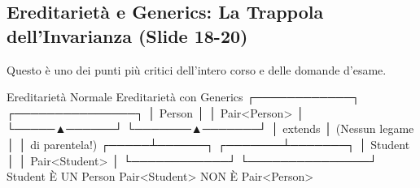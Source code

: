 \documentclass[11pt,a4paper,oneside]{report}
\begin{document}
\subsection{Ereditarietà e Generics: La Trappola dell'Invarianza (Slide
18-20)}\label{chap14_ereditarietuxe0-e-generics-la-trappola-dellinvarianza-slide-18-20}

Questo è uno dei punti più critici dell'intero corso e delle domande
d'esame.

\needspace{7cm}
\begin{asciibox}
   Ereditarietà Normale             Ereditarietà con Generics
      ┌────────────┐                     ┌───────────────┐
      │   Person   │                     │ Pair<Person>  │
      └─────▲──────┘                     └───────▲───────┘
            │ extends                            │ (Nessun legame
            │                                    │  di parentela!)
      ┌─────┴──────┐                     ┌───────┴───────┐
      │  Student   │                     │ Pair<Student> │
      └────────────┘                     └───────────────┘
   Student È UN Person             Pair<Student> NON È Pair<Person>
\end{asciibox}
\end{document}
